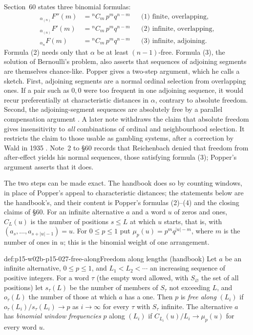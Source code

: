 Section~60 states three binomial formulas:
\[
\begin{aligned}
 {}_{\alpha_{(n)}}F''(m)&={}^nC_m\,p^mq^{n-m} &&\text{(1) finite, overlapping},\\
 {}_{\alpha_{(n)}}F'(m)&={}^nC_m\,p^mq^{n-m} &&\text{(2) infinite, overlapping},\\
 {}_{\alpha_{n}}F(m)&={}^nC_m\,p^mq^{n-m} &&\text{(3) infinite, adjoining}.
\end{aligned}
\]
Formula (2) needs only that \(\alpha\) be at least \((n-1)\)-free. Formula
(3), the solution of Bernoulli's problem, also asserts that sequences of
adjoining segments are themselves chance-like. Popper gives a two-step
argument, which he calls a sketch. First, adjoining segments are a
normal ordinal selection from overlapping ones. If a pair such as
\(0,0\) were too frequent in one adjoining sequence, it would recur
preferentially at characteristic distances in \(\alpha\), contrary to
absolute freedom. Second, the adjoining-segment sequences are
absolutely free by a parallel compensation argument
\parencite[\S60 and note~*1]{Popper2002LogicDiscoveryUI}.
A later note withdraws the claim that absolute freedom
gives insensitivity to \emph{all} combinations of ordinal and
neighbourhood selection. It restricts the claim to those usable as
gambling systems, after a correction by Wald in 1935
\parencite[\S60, note~*3]{Popper2002LogicDiscoveryUI}.
Note~2 to \S60 records that Reichenbach denied that freedom from
after-effect yields his normal sequences, those satisfying formula (3);
Popper's argument asserts that it does.

The two steps can be made exact. The handbook does so by counting
windows, in place of Popper's appeal to characteristic distances; the
statements below are the handbook's, and their content is Popper's
formulas (2)--(4) and the closing claims of \S60. For an infinite
alternative \(a\) and a word \(u\) of zeros and ones, \(C_L(u)\) is the
number of positions \(s\leq L\) at which \(u\) starts, that is, with
\((a_s,\ldots,a_{s+|u|-1})=u\). For \(0\leq p\leq1\) put
\(\mu_p(u)=p^{m}q^{|u|-m}\), where \(m\) is the number of ones in \(u\);
this is the binomial weight of one arrangement.

\begin{hbdefinition}{def:p15-w02b-p15-027-free-along}{Freedom along lengths (handbook)}
Let \(a\) be an infinite alternative, \(0\leq p\leq1\), and
\(L_1<L_2<\cdots\) an increasing sequence of positive integers. For a word
\(\tau\) (the empty word allowed, with \(S_\varnothing\) the set of all
positions) let \(s_\tau(L)\) be the number of members of \(S_\tau\) not
exceeding \(L\), and \(o_\tau(L)\) the number of those at which \(a\)
has a one. Then \(p\) is \emph{free along} \((L_i)\) if
\(o_\tau(L_i)/s_\tau(L_i)\to p\) as \(i\to\infty\) for every \(\tau\)
with \(S_\tau\) infinite. The alternative \(a\) has \emph{binomial
window frequencies} \(p\) along \((L_i)\) if
\(C_{L_i}(u)/L_i\to\mu_p(u)\) for every word \(u\).
\end{hbdefinition}

